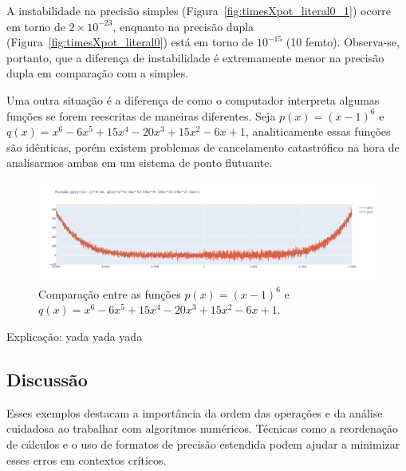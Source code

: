 A instabilidade na precisão simples (Figura~\ref{fig:timesXpot_literal0_1}) ocorre em torno de $2 \times 10^{-23}$, enquanto na precisão dupla (Figura~\ref{fig:timesXpot_literal0}) está em torno de $10^{-15}$ (10 femto). Observa-se, portanto, que a diferença de instabilidade é extremamente menor na precisão dupla em comparação com a simples.

Uma outra situação é a diferença de como o computador interpreta algumas funções se forem reescritas de maneiras diferentes. Seja $p(x) = (x - 1)^6$ e $q(x) = x^6 - 6x^5 + 15x^4 - 20x^3 + 15x^2 - 6x + 1$, analiticamente essas funções são idênticas, porém existem problemas de cancelamento catastrófico na hora de analisarmos ambas em um sistema de ponto flutuante.

\begin{figure}[H]
    \centering 
    \includegraphics[width=1\textwidth]{Imagens/error2.png}
    \caption{Comparação entre as funções $p(x) = (x - 1)^6$ e $q(x) = x^6 - 6x^5 + 15x^4 - 20x^3 + 15x^2 - 6x + 1$.}
    \label{fig:error2}
\end{figure}
Explicação: yada yada yada 

\subsection{Discussão}

Esses exemplos destacam a importância da ordem das operações e da análise cuidadosa ao trabalhar com algoritmos numéricos. Técnicas como a reordenação de cálculos e o uso de formatos de precisão estendida podem ajudar a minimizar esses erros em contextos críticos.

